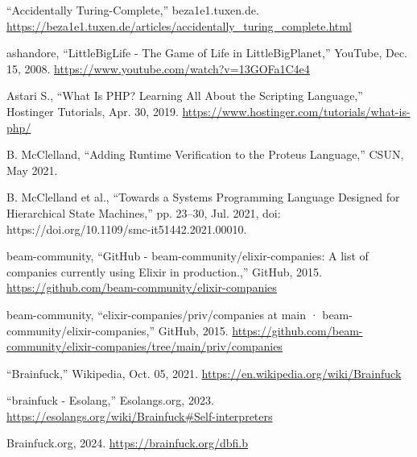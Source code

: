 \documentclass[12pt]{report} %
\begin{document}
\begin{singlespace}
\begin{thebibliography}{}
             “Accidentally Turing-Complete,” beza1e1.tuxen.de. \href{https://beza1e1.tuxen.de/articles/accidentally_turing_complete.html}{https://beza1e1.tuxen.de/articles/accident\-ally\_turing\_complete.html}
            
             ashandore, “LittleBigLife - The Game of Life in LittleBigPlanet,” YouTube, Dec. 15, 2008. \href{https://www.youtube.com/watch?v=13GOFa1C4e4}{https://www.youtube.com/watch?v=13GOFa1C4e4}
            
             Astari S., “What Is PHP? Learning All About the Scripting Language,” Hostinger Tutorials, Apr. 30, 2019. \href{https://www.hostinger.com/tutorials/what-is-php/}{https://www.hostinger.com/tutorials/what-is-php/}
            
             B. McClelland, “Adding Runtime Verification to the Proteus Language,” CSUN, May 2021.
            
             B. McClelland et al., “Towards a Systems Programming Language Designed for Hierarchical State Machines,” pp. 23–30, Jul. 2021, doi: https://doi.org/10.1109/smc-it51442.2021.00010.
            
             beam-community, “GitHub - beam-community/elixir-companies: A list of companies currently using Elixir in production.,” GitHub, 2015. \href{https://github.com/beam-community/elixir-companies}{https://github.com/beam-community/elixir-companies}
            
             beam-community, “elixir-companies/priv/companies at main · beam-community/elixir-companies,” GitHub, 2015. \href{https://github.com/beam-community/elixir-companies/tree/main/priv/companies}{https://github.com/beam-community/elixir-companies/tree/main/priv/companies}
            
             “Brainfuck,” Wikipedia, Oct. 05, 2021. \href{https://en.wikipedia.org/wiki/Brainfuck}{https://en.wikipedia.org/wiki/Brainfuck}
            
             “brainfuck - Esolang,” Esolangs.org, 2023. \href{https://esolangs.org/wiki/Brainfuck#Self-interpreters}{https://esolangs.org/wiki/Brainfuck\#Self-interpreters}
            
             Brainfuck.org, 2024. \href{https://brainfuck.org/dbfi.b}{https://brainfuck.org/dbfi.b}
            

\end{thebibliography}
\end{singlespace}
\end{document}
